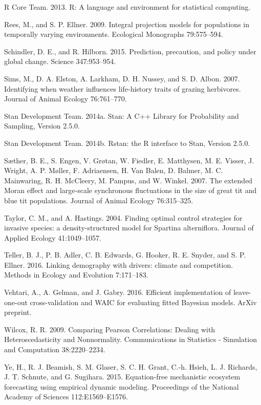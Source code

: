 \documentclass[12pt,]{article}
\begin{document}
\hypertarget{ref-R2013}{}
R Core Team. 2013. R: A language and environment for statistical
computing.

\hypertarget{ref-Rees2009}{}
Rees, M., and S. P. Ellner. 2009. Integral projection models for
populations in temporally varying environments. Ecological Monographs
79:575--594.

\hypertarget{ref-Schindler2015b}{}
Schindler, D. E., and R. Hilborn. 2015. Prediction, precaution, and
policy under global change. Science 347:953--954.

\hypertarget{ref-Sims2007}{}
Sims, M., D. A. Elston, A. Larkham, D. H. Nussey, and S. D. Albon. 2007.
Identifying when weather influences life-history traits of grazing
herbivores. Journal of Animal Ecology 76:761--770.

\hypertarget{ref-stan2014}{}
Stan Development Team. 2014a. Stan: A C++ Library for Probability and
Sampling, Version 2.5.0.

\hypertarget{ref-rstan2014}{}
Stan Development Team. 2014b. Rstan: the R interface to Stan, Version
2.5.0.

\hypertarget{ref-Suxe6ther2007}{}
Sæther, B. E., S. Engen, V. Grøtan, W. Fiedler, E. Matthysen, M. E.
Visser, J. Wright, A. P. Møller, F. Adriaensen, H. Van Balen, D. Balmer,
M. C. Mainwaring, R. H. McCleery, M. Pampus, and W. Winkel. 2007. The
extended Moran effect and large-scale synchronous fluctuations in the
size of great tit and blue tit populations. Journal of Animal Ecology
76:315--325.

\hypertarget{ref-Taylor2004}{}
Taylor, C. M., and A. Hastings. 2004. Finding optimal control strategies
for invasive species: a density-structured model for Spartina
alterniflora. Journal of Applied Ecology 41:1049--1057.

\hypertarget{ref-Teller2016}{}
Teller, B. J., P. B. Adler, C. B. Edwards, G. Hooker, R. E. Snyder, and
S. P. Ellner. 2016. Linking demography with drivers: climate and
competition. Methods in Ecology and Evolution 7:171--183.

\hypertarget{ref-Vehtari2016}{}
Vehtari, A., A. Gelman, and J. Gabry. 2016. Efficient implementation of
leave-one-out cross-validation and WAIC for evaluating fitted Bayesian
models. ArXiv preprint.

\hypertarget{ref-Wilcox2009}{}
Wilcox, R. R. 2009. Comparing Pearson Correlations: Dealing with
Heteroscedasticity and Nonnormality. Communications in Statistics -
Simulation and Computation 38:2220--2234.

\hypertarget{ref-Ye2015a}{}
Ye, H., R. J. Beamish, S. M. Glaser, S. C. H. Grant, C.-h. Hsieh, L. J.
Richards, J. T. Schnute, and G. Sugihara. 2015. Equation-free
mechanistic ecosystem forecasting using empirical dynamic modeling.
Proceedings of the National Academy of Sciences 112:E1569--E1576.
\end{document}
